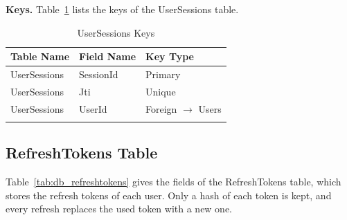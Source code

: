 \par\ifdim\dimexpr\pagegoal-\pagetotal\relax<180pt\newpage\fi
\noindent\textbf{Keys.} Table~\ref{tab:keys_usersessions} lists the keys of the UserSessions table.

{\small
\begin{longtable}{>{\raggedright\arraybackslash}p{4.0cm}>{\raggedright\arraybackslash}p{4.6cm}>{\raggedright\arraybackslash}p{4.6cm}}
\caption{UserSessions Keys}\label{tab:keys_usersessions}\\
\hline\hline
\textbf{Table Name} & \textbf{Field Name} & \textbf{Key Type} \\ \hline
\endfirsthead
\hline\hline
\endlastfoot
UserSessions & SessionId & Primary \\*
UserSessions & Jti & Unique \\*
UserSessions & UserId & Foreign $\rightarrow$ Users \\*
\end{longtable}
}

\par\ifdim\dimexpr\pagegoal-\pagetotal\relax<376pt\newpage\fi
\subsection{RefreshTokens Table}
Table~\ref{tab:db_refreshtokens} gives the fields of the RefreshTokens table, which stores the refresh tokens of each user. Only a hash of each token is kept, and every refresh replaces the used token with a new one.

